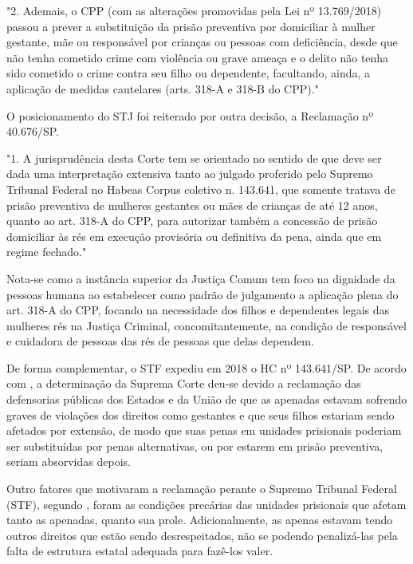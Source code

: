 \noindent
\begin{flushleft}
\setlength{\leftskip}{4cm}
\small
"2. Ademais, o CPP (com as alterações promovidas pela Lei nº 13.769/2018) passou a prever a substituição da prisão preventiva  por domiciliar à mulher gestante, mãe ou responsável por crianças ou pessoas com deficiência, desde que não tenha cometido crime com violência ou grave ameaça e o delito não tenha sido cometido o crime 	contra seu filho ou dependente, facultando, ainda, a aplicação de medidas cautelares (arts. 318-A e 318-B do CPP)." \cite{rhc145931}
\end{flushleft}

O posicionamento do STJ foi reiterado por outra decisão, a Reclamação nº 40.676/SP.

\noindent
\begin{flushleft}
\setlength{\leftskip}{4cm}
\small
"1. A jurisprudência desta Corte tem se orientado no sentido de que deve ser dada uma interpretação extensiva tanto ao julgado proferido pelo Supremo Tribunal Federal no Habeas Corpus coletivo n. 143.641, que somente tratava de prisão preventiva de mulheres gestantes ou mães de crianças de até 12 anos, quanto ao art. 318-A do CPP, para autorizar também a concessão de prisão domiciliar às rés em execução provisória ou definitiva da pena, ainda que em regime fechado." \cite{reclamacao40676}
\end{flushleft}

Nota-se como a instância superior da Justiça Comum tem foco na dignidade da pessoas humana ao estabelecer como padrão de julgamento a aplicação plena do art. 318-A do CPP, focando na necessidade dos filhos e dependentes legais das mulheres rés na Justiça Criminal, concomitantemente, na condição de responsável e cuidadora de pessoas das rés de pessoas que delas dependem.

De forma complementar, o STF expediu em 2018 o HC nº 143.641/SP. De acordo com \cite{hc143641}, a determinação da Suprema Corte deu-se devido a reclamação das defensorias públicas dos Estados e da União de que as apenadas estavam sofrendo graves de violações dos direitos como gestantes e que seus filhos estariam sendo afetados por extensão, de modo que suas penas em unidades prisionais poderiam ser substituídas por penas alternativas, ou por estarem em prisão preventiva, seriam absorvidas depois. 
	
Outro fatores que motivaram a reclamação perante o Supremo Tribunal Federal (STF), segundo \cite{hc143641}, foram as condições precárias das unidades prisionais que afetam tanto as apenadas, quanto sua prole. Adicionalmente, as apenas estavam tendo outros direitos que estão sendo desrespeitados, não se podendo penalizá-las pela falta de estrutura estatal adequada para fazê-los valer.

